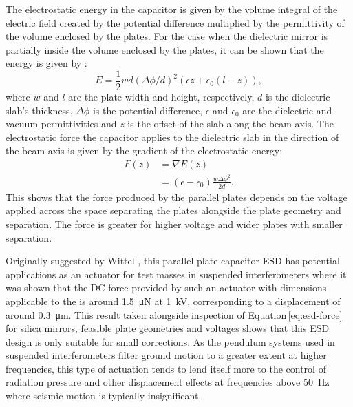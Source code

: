 The electrostatic energy in the capacitor is given by the volume integral of the electric field created by the potential difference multiplied by the permittivity of the volume enclosed by the plates. For the case when the dielectric mirror is partially inside the volume enclosed by the plates, it can be shown that the energy is given by \cite{Margulies1984}:
\begin{equation}
  E = \frac{1}{2} w d \left( \Delta \phi / d \right)^2 \left( \epsilon z + \epsilon_0 \left( l - z \right) \right),
\end{equation}
where $w$ and $l$ are the plate width and height, respectively, $d$ is the dielectric slab's thickness, $\Delta \phi$ is the potential difference, $\epsilon$ and $\epsilon_0$ are the dielectric and vacuum permittivities and $z$ is the offset of the slab along the beam axis. The electrostatic force the capacitor applies to the dielectric slab in the direction of the beam axis is given by the gradient of the electrostatic energy:
\begin{equation}
  \label{eq:esd-force}
  \begin{split}
    F \left( z \right) &= \nabla E \left( z \right) \\
                       &= \left( \epsilon - \epsilon_0 \right) \frac{w \Delta \phi^2}{2 d}.
  \end{split}
\end{equation}
This shows that the force produced by the parallel plates depends on the voltage applied across the space separating the plates alongside the plate geometry and separation. The force is greater for higher voltage and wider plates with smaller separation.

Originally suggested by Wittel \etal{} \cite{Wittel2015}, this parallel plate capacitor \gls{ESD} has potential applications as an actuator for test masses in suspended interferometers where it was shown that the \gls{DC} force provided by such an actuator with dimensions applicable to the \AEIPROTOTYPE{} is around \SI{1.5}{\micro\newton} at \SI{1}{\kilo\volt}, corresponding to a displacement of around \SI{0.3}{\micro\meter}. This result taken alongside inspection of Equation\,\ref{eq:esd-force} for silica mirrors, feasible plate geometries and voltages shows that this \gls{ESD} design is only suitable for small corrections. As the pendulum systems used in suspended interferometers filter ground motion to a greater extent at higher frequencies, this type of actuation tends to lend itself more to the control of radiation pressure and other displacement effects at frequencies above \SI{50}{\hertz} where seismic motion is typically insignificant.

